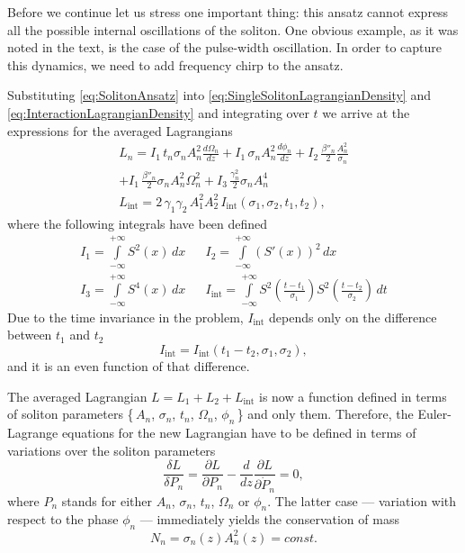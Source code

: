 \documentclass[a4paper, 11pt]{article}
\begin{document}
Before we continue let us stress one important thing: this ansatz cannot express all the possible internal oscillations of the soliton. One obvious example, as it was noted in the text, is the case of the pulse-width oscillation. In order to capture this dynamics, we need to add frequency chirp to the ansatz.

Substituting \eqref{eq:SolitonAnsatz} into \eqref{eq:SingleSolitonLagrangianDensity} and \eqref{eq:InteractionLagrangianDensity} and integrating over $t$ we arrive at the expressions for the averaged Lagrangians
\begin{gather}
  L_{n} =
    I_{1} \, t_{n} \sigma_{n} A_{n}^{2} \frac{d \Omega_{n}}{d z} +
    I_{1} \, \sigma_{n} A_{n}^{2} \frac{d \phi_{n}}{d z} +
    I_{2} \, \frac{\beta''_{n}}{2} \frac{A_{n}^{2}}{\sigma_{n}} \nonumber \\
    + I_{1} \, \frac{\beta''_{n}}{2} \sigma_{n} A_{n}^{2} \Omega_{n}^{2} +
    I_{3} \, \frac{\gamma_{n}^{2}}{2} \sigma_{n} A_{n}^{4} \\
  L_{\text{int}} =
    2 \, \gamma_{1} \gamma_{2} \, A_{1}^{2} A_{2}^{2} \,
    I_{\text{int}}(\sigma_{1}, \sigma_{2}, t_{1}, t_{2}),
\end{gather}
where the following integrals have been defined
\begin{align*}
  I_{1} =
    \int \limits_{-\infty}^{+\infty}
    S^{2}(x) \, dx &&
  I_{2} =
    \int \limits_{-\infty}^{+\infty}
    (S'(x))^{2} \, dx \\
  I_{3} =
    \int \limits_{-\infty}^{+\infty}
    S^{4}(x) \, dx &&
  I_{\text{int}} =
    \int \limits_{-\infty}^{+\infty}
    S^{2}\left(
      \frac{t - t_{1}}{\sigma_{1}}
    \right)
    S^{2}\left(
      \frac{t - t_{2}}{\sigma_{2}}
    \right) \, dt
\end{align*}
Due to the time invariance in the problem, $I_{\text{int}}$ depends only on the difference between $t_{1}$ and $t_{2}$
\begin{equation*}
  I_{\text{int}} = I_{\text{int}}(t_{1} - t_{2}, \sigma_{1}, \sigma_{2}),
\end{equation*}
and it is an even function of that difference.

The averaged Lagrangian $L = L_{1} + L_{2} + L_{\text{int}}$ is now a function defined in terms of soliton parameters \{\,$A_{n}$, $\sigma_{n}$, $t_{n}$, $\Omega_{n}$, $\phi_{n}$\,\} and only them. Therefore, the Euler-Lagrange equations for the new Lagrangian have to be defined in terms of variations over the soliton parameters
\begin{equation*}
  \frac{\delta L}{\delta P_{n}} =
    \frac{\partial{L}}{{\partial P_{n}}} -
    \frac{d}{dz} \frac{\partial L}{\partial \dot P_{n}} = 0,
\end{equation*}
where $P_{n}$ stands for either $A_{n}$, $\sigma_{n}$, $t_{n}$, $\Omega_{n}$ or $\phi_{n}$. The latter case --- variation with respect to the phase $\phi_{n}$ --- immediately yields the conservation of mass
\begin{equation}
  \label{eq:ConservationOfMass}
  N_{n} = \sigma_{n}(z) A_{n}^{2}(z) = const.
\end{equation}
\end{document}
